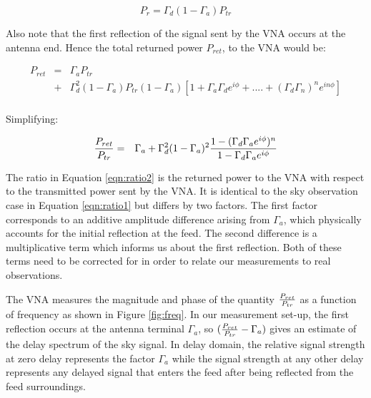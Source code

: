 \documentclass[12pt,preprint]{aastex}
\begin{document}
\begin{equation}
P_{r}= \Gamma_{d}(1-\Gamma_a) P_{tr}
\end{equation}

Also note that the first reflection of the signal sent by the VNA occurs at the antenna end. Hence the total returned power $P_{ret}$, to the VNA  would be:

\begin{eqnarray}
P_{ret} & = & \Gamma_{a}P_{tr} \nonumber\\ 
 & + &   \Gamma_{d}^{2}(1-\Gamma_a) P_{tr}(1-\Gamma_{a}) [1+ \Gamma_{a}\Gamma_{d} e^{i\phi}+  ....+ (\Gamma_{d}\Gamma_{n})^{n}e^{in\phi}]\nonumber\\
 \end{eqnarray}
 
Simplifying:
 
  \begin{eqnarray}\label{eqn:ratio2}
 {P_{ret} \over P_{tr} } & = & \Gamma_{a}
  +  \Gamma_{d}^{2}(1-\Gamma_a)^{2}  {1-(\Gamma_{d}\Gamma_{a}e^{i\phi})^{n} \over 1-\Gamma_{d} \Gamma_{a}e^{i\phi} } \nonumber\\
\end{eqnarray}

The ratio in Equation \ref{eqn:ratio2} is the returned power to the VNA with
respect to the transmitted power sent by the VNA. It is identical to the sky
observation case in Equation \ref{eqn:ratio1} but differs by two factors. The
first factor corresponds to an additive amplitude difference arising from
$\Gamma_{a}$, which physically accounts for the initial reflection at the feed.
The second difference is a multiplicative term which informs us about the first
reflection. Both of these terms need to be corrected for in order to relate our
measurements to real observations.

The VNA measures the magnitude and phase of the quantity ${P_{ret}\over P_{tr}}$
as a function of frequency as shown in Figure \ref{fig:freq}. In our measurement
set-up, the first reflection occurs at the antenna terminal $\Gamma_{a}$, so
$({P_{ret} \over P_{tr} }  - \Gamma_{a}) $ gives an estimate of the delay
spectrum of the sky signal. In delay domain, the relative signal strength at
zero delay represents the factor $\Gamma_{a}$ while the signal strength at any
other delay represents any delayed signal that enters the feed after being
reflected from the feed surroundings. 
\end{document}
